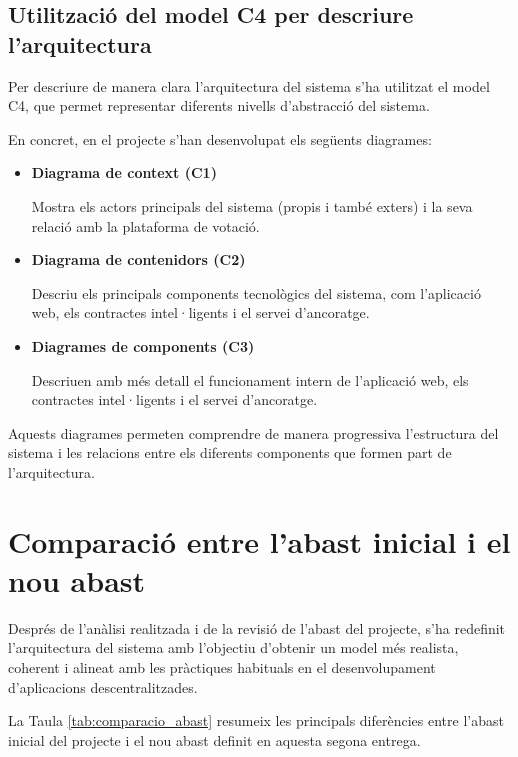 \documentclass[12pt,a4paper]{article}
\begin{document}
\subsection{Utilització del model C4 per descriure l'arquitectura}

Per descriure de manera clara l'arquitectura del sistema s'ha utilitzat el model C4, que permet representar diferents nivells d'abstracció del sistema.

En concret, en el projecte s'han desenvolupat els següents diagrames:

\begin{itemize}

\item \textbf{Diagrama de context (C1)}

Mostra els actors principals del sistema (propis i també exters) i la seva relació amb la plataforma de votació.

\item \textbf{Diagrama de contenidors (C2)}

Descriu els principals components tecnològics del sistema, com l'aplicació web, els contractes intel·ligents i el servei d'ancoratge.

\item \textbf{Diagrames de components (C3)}

Descriuen amb més detall el funcionament intern de l'aplicació web, els contractes intel·ligents i el servei d'ancoratge.
\end{itemize}

Aquests diagrames permeten comprendre de manera progressiva l'estructura del sistema i les relacions entre els diferents components que formen part de l'arquitectura.


\section{Comparació entre l'abast inicial i el nou abast}

Després de l'anàlisi realitzada i de la revisió de l'abast del projecte, s'ha redefinit l'arquitectura del sistema amb l'objectiu d'obtenir un model més realista, coherent i alineat amb les pràctiques habituals en el desenvolupament d'aplicacions descentralitzades.

La Taula \ref{tab:comparacio_abast} resumeix les principals diferències entre l'abast inicial del projecte i el nou abast definit en aquesta segona entrega.
\end{document}

